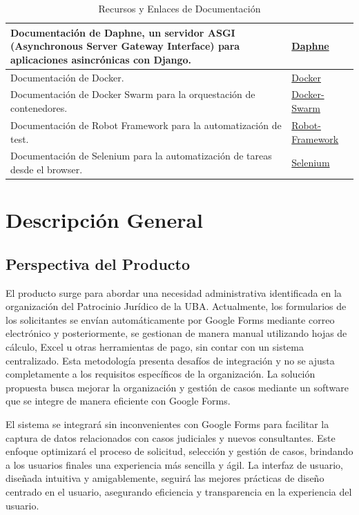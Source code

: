 \begin{table}[H]
\begin{tabular}{|p{11cm}|p{4cm}|}
        \hline
        Documentación de Daphne, un servidor ASGI (Asynchronous Server Gateway Interface) para aplicaciones asincrónicas con Django. & \href{https://docs.djangoproject.com/en/5.0/howto/deployment/asgi/daphne/}{Daphne}\\
        \hline
        Documentación de Docker. & \href{https://docs.docker.com/engine/}{Docker} \\
        \hline
        Documentación de Docker Swarm para la orquestación de contenedores. & \href{https://docs.docker.com/engine/swarm/}{Docker-Swarm}\\
        \hline
        Documentación de Robot Framework para la automatización de test. & \href{https://robotframework.org/robotframework/latest/RobotFrameworkUserGuide.html}{Robot-Framework}\\
        \hline
        Documentación de Selenium para la automatización de tareas desde el browser. & \href{https://robotframework.org/SeleniumLibrary/SeleniumLibrary.html}{Selenium}\\
        \hline
    \end{tabular}
    \caption{Recursos y Enlaces de Documentación}
    \label{tab:recursos_documentacion}
\end{table}



\newpage

\section{Descripción General}

\subsection{Perspectiva del Producto}
El producto surge para abordar una necesidad administrativa identificada en la organización del Patrocinio Jurídico de la UBA. Actualmente, los formularios de los solicitantes se envían automáticamente por Google Forms mediante correo electrónico  y posteriormente, se gestionan de manera manual utilizando hojas de cálculo, Excel u otras herramientas de pago, sin contar con un sistema centralizado. Esta metodología presenta desafíos de integración y no se ajusta completamente a los requisitos específicos de la organización. La solución propuesta busca mejorar la organización y gestión de casos mediante un software que se integre de manera eficiente con Google Forms.

El sistema se integrará sin inconvenientes con Google Forms para facilitar la captura de datos relacionados con casos judiciales y nuevos consultantes. Este enfoque optimizará el proceso de solicitud, selección y gestión de casos, brindando a los usuarios finales una experiencia más sencilla y ágil. La interfaz de usuario, diseñada intuitiva y amigablemente, seguirá las mejores prácticas de diseño centrado en el usuario, asegurando eficiencia y transparencia en la experiencia del usuario.

